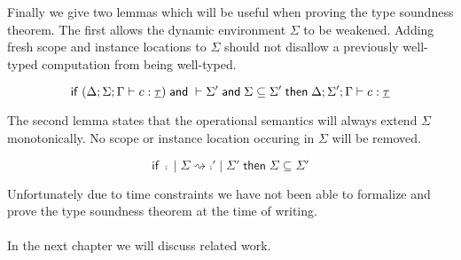 {Finally we give two lemmas which will be useful when proving the type soundness theorem.
The first allows the dynamic environment $\Sigma$ to be weakened.
Adding fresh scope and instance locations to $\Sigma$ should not disallow a previously well-typed computation from being well-typed.

\begin{lemma}
\[
	\mathsf{if}\;
		(\Delta;\Sigma;\Gamma \vdash c : \underline{\tau})
		\;\mathsf{and}\;
		\vdash \Sigma'
		\;\mathsf{and}\;
		\Sigma \subseteq \Sigma'
	\;\mathsf{then}\;
		\Delta;\Sigma';\Gamma \vdash c : \underline{\tau}
\]
\end{lemma}

The second lemma states that the operational semantics will always extend $\Sigma$ monotonically.
No scope or instance location occuring in $\Sigma$ will be removed.

\begin{lemma}
\[
	\mathsf{if}\;
		\comp \;|\; \Sigma \rightsquigarrow \comp' \;|\; \Sigma'
	\;\mathsf{then}\;
		\Sigma \subseteq \Sigma'
\]
\end{lemma}

Unfortunately due to time constraints we have not been able to formalize and prove the type soundness theorem at the time of writing.
\\\\
In the next chapter we will discuss related work.

}
